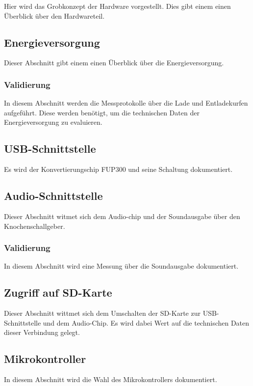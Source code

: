 Hier wird das Grobkonzept der Hardware vorgestellt. Dies gibt einem einen Überblick über den Hardwareteil.

\subsection{Energieversorgung}
Dieser Abschnitt gibt einem einen Überblick über die Energieversorgung.

\subsubsection{Validierung}
In diesem Abschnitt werden die Messprotokolle über die Lade und Entladekurfen aufgeführt. Diese werden benötigt, um die technischen Daten der Energieversorgung zu evaluieren.

\subsection{USB-Schnittstelle}
Es wird der Konvertierungschip FUP300 und seine Schaltung dokumentiert.

\subsection{Audio-Schnittstelle}
Dieser Abschnitt witmet sich dem Audio-chip und der Soundausgabe über den Knochenschallgeber. 

\subsubsection{Validierung}
In diesem Abschnitt wird eine Messung über die Soundausgabe dokumentiert.

\subsection{Zugriff auf SD-Karte}
Dieser Abschnitt wittmet sich dem Umschalten der SD-Karte zur USB-Schnittstelle und dem Audio-Chip. Es wird dabei Wert auf die technischen Daten dieser Verbindung gelegt.

\subsection{Mikrokontroller}
In diesem Abschnitt wird die Wahl des Mikrokontrollers dokumentiert.